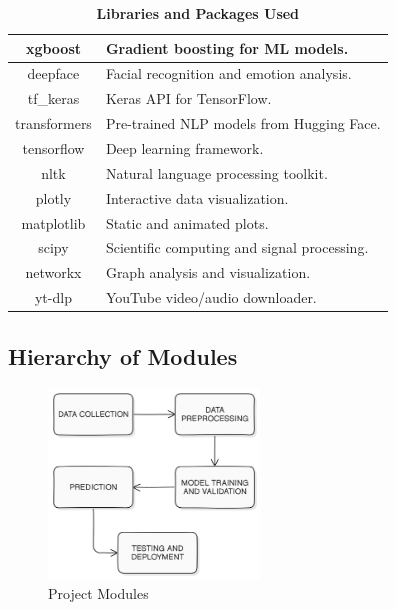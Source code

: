 \begin{table}[H]
\begin{tabular}{|c|p{12cm}|}
        \hline
        xgboost & Gradient boosting for ML models. \\
        \hline
        deepface & Facial recognition and emotion analysis. \\
        \hline
        tf\_keras & Keras API for TensorFlow. \\
        \hline
        transformers & Pre-trained NLP models from Hugging Face. \\
        \hline
        tensorflow & Deep learning framework. \\
        \hline
        nltk & Natural language processing toolkit. \\
        \hline
        plotly & Interactive data visualization. \\
        \hline 
        matplotlib & Static and animated plots. \\
        \hline
        scipy & Scientific computing and signal processing. \\
        \hline
        networkx & Graph analysis and visualization. \\
        \hline
        yt-dlp & YouTube video/audio downloader. \\
        \hline
    \end{tabular}
    \caption*{\textbf{Libraries and Packages Used}}
    \label{tab:libraries}
\end{table}

\pagebreak

\subsection{Hierarchy of Modules}
\begin{figure}[h!]  
    \centering
    \includegraphics[width=0.5\textwidth]{Images/Project Modules.png}  
    \caption{Project Modules}
    \label{Project Modules}  %
\end{figure}


